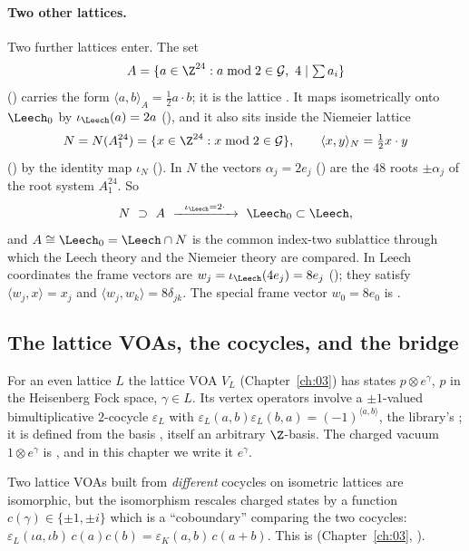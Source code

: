 \paragraph{Two other lattices.} Two further lattices enter. The set
\begin{equation*}
  A=\{a\in\Z^{24} : a\bmod 2\in\mathcal G,\ 4\mid \textstyle\sum a_i\}
\end{equation*}
() carries the form $\langle a,b\rangle_A=\tfrac12 a\cdot b$; it is the lattice
. It maps isometrically onto $\Leech_0$ by $\iota_\Leech(a)=2a$ (), and it
also sits inside the Niemeier lattice
\begin{equation*}
  N=N(A_1^{24})=\{x\in\Z^{24}: x\bmod2\in\mathcal G\},\qquad \langle x,y\rangle_N=\tfrac12 x\cdot y
\end{equation*}
() by the identity map $\iota_N$ (). In $N$ the vectors $\alpha_j=2e_j$
() are the $48$ roots $\pm\alpha_j$ of the root system $A_1^{24}$. So
\begin{equation*}
  N\ \supset\ A\ \xrightarrow{\ \ \iota_\Leech=2\cdot\ \ }\ \Leech_0\subset\Leech,
\end{equation*}
and $A\cong\Leech_0=\Leech\cap N$ is the common index-two sublattice through which the
Leech theory and the Niemeier theory are compared. In Leech coordinates the frame vectors are
$w_j=\iota_\Leech(4e_j)=8e_j$ (); they satisfy $\langle w_j,x\rangle=x_j$ and
$\langle w_j,w_k\rangle=8\delta_{jk}$. The special frame vector $w_0=8e_0$ is .

\subsection{The lattice VOAs, the cocycles, and the bridge}
For an even lattice $L$ the lattice VOA $V_L$ (Chapter~\ref{ch:03}) has states $p\otimes e^\gamma$,
$p$ in the Heisenberg Fock space, $\gamma\in L$. Its vertex operators involve a $\pm1$-valued
bimultiplicative $2$-cocycle $\varepsilon_L$ with $\varepsilon_L(a,b)\varepsilon_L(b,a)=(-1)^{\langle
a,b\rangle}$, the library's ; it is defined from the basis
, itself an arbitrary $\Z$-basis. The charged vacuum $1\otimes e^\gamma$ is
, and in this chapter we write it $e^\gamma$.

Two lattice VOAs built from \emph{different} cocycles on isometric lattices are isomorphic, but the
isomorphism rescales charged states by a function $c(\gamma)\in\{\pm1,\pm i\}$ which is a
``coboundary'' comparing the two cocycles: $\varepsilon_L(\iota a,\iota b)\,c(a)c(b) =
\varepsilon_K(a,b)\,c(a+b)$. This is  (Chapter~\ref{ch:03},
).

